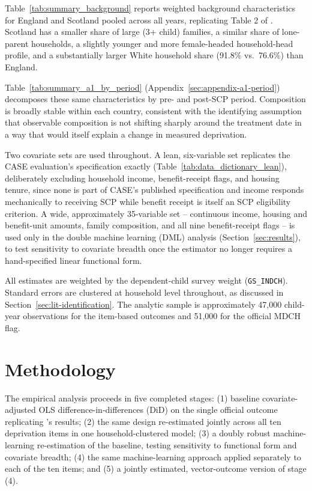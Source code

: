 

Table~\ref{tab:summary_background} reports weighted background characteristics for England and Scotland pooled across all years, replicating Table 2 of \citet{andersen2025}. Scotland has a smaller share of large (3+ child) families, a similar share of lone-parent households, a slightly younger and more female-headed household-head profile, and a substantially larger White household share (91.8\% vs.\ 76.6\%) than England. 



Table~\ref{tab:summary_a1_by_period} (Appendix~\ref{sec:appendix-a1-period}) decomposes these same characteristics by pre- and post-SCP period. Composition is broadly stable within each country, consistent with the identifying assumption that observable composition is not shifting sharply around the treatment date in a way that would itself explain a change in measured deprivation.

Two covariate sets are used throughout. A lean, six-variable set replicates the CASE evaluation's specification exactly \citep{andersen2025} (Table~\ref{tab:data_dictionary_lean}), deliberately excluding household income, benefit-receipt flags, and housing tenure, since none is part of CASE's published specification and income responds mechanically to receiving SCP while benefit receipt is itself an SCP eligibility criterion. A wide, approximately 35-variable set -- continuous income, housing and benefit-unit amounts, family composition, and all nine benefit-receipt flags -- is used only in the double machine learning (DML) analysis (Section~\ref{sec:results}), to test sensitivity to covariate breadth once the estimator no longer requires a hand-specified linear functional form.
 
All estimates are weighted by the dependent-child survey weight (\texttt{GS\_INDCH}). Standard errors are clustered at household level throughout, as discussed in Section~\ref{sec:lit-identification}. The analytic sample is approximately 47,000 child-year observations for the item-based outcomes and 51,000 for the official MDCH flag.
 
\section{Methodology}
\label{sec:methodology}
 
The empirical analysis proceeds in five completed stages: (1) baseline covariate-adjusted OLS difference-in-differences (DiD) on the single official outcome replicating \citeauthor{andersen2025}'s results; (2) the same design re-estimated jointly across all ten deprivation items in one household-clustered model; (3) a doubly robust machine-learning re-estimation of the baseline, testing sensitivity to functional form and covariate breadth; (4) the same machine-learning approach applied separately to each of the ten items; and (5) a jointly estimated, vector-outcome version of stage (4).
 
